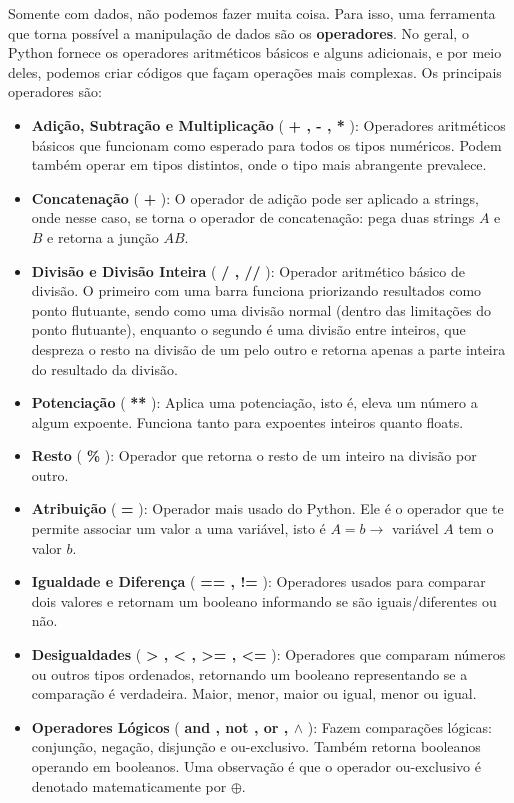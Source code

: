 \documentclass[11pt, a4paper]{article}
\begin{document}
    Somente com dados, não podemos fazer muita coisa. Para isso, uma ferramenta que torna possível a manipulação de dados são os \textbf{operadores}. No geral, o Python fornece os operadores aritméticos básicos e alguns adicionais, e por meio deles, podemos criar códigos que façam operações mais complexas. Os principais operadores são:

\begin{itemize}
    \item \textbf{Adição, Subtração e Multiplicação} (\textbf{ + , - , * }): Operadores aritméticos básicos que funcionam como esperado para todos os tipos numéricos. Podem também operar em tipos distintos, onde o tipo mais abrangente prevalece.

    \item \textbf{Concatenação} (\textbf{ + }): O operador de adição pode ser aplicado a strings, onde nesse caso, se torna o operador de concatenação: pega duas strings \(A\) e \(B\) e retorna a junção \(AB\).

    \item \textbf{Divisão e Divisão Inteira} (\textbf{ / , // }): Operador aritmético básico de divisão. O primeiro com uma barra funciona priorizando resultados como ponto flutuante, sendo como uma divisão normal (dentro das limitações do ponto flutuante), enquanto o segundo é uma divisão entre inteiros, que despreza o resto na divisão de um pelo outro e retorna apenas a parte inteira do resultado da divisão.

    \item \textbf{Potenciação} (     \textbf{**} ): Aplica uma potenciação, isto é, eleva um número a algum expoente. Funciona tanto para expoentes inteiros quanto floats.

    \item \textbf{Resto} ( \textbf{\%} ): Operador que retorna o resto de um inteiro na divisão por outro.

    \item \textbf{Atribuição} ( \textbf{=} ): Operador mais usado do Python. Ele é o operador que te permite associar um valor a uma variável, isto é \(A=b \rightarrow\) variável \(A\) tem o valor \(b\).

    \item \textbf{Igualdade e Diferença} (\textbf{ == , != }): Operadores usados para comparar dois valores e retornam um booleano informando se são iguais/diferentes ou não.

    \item \textbf{Desigualdades} ( \textbf{> , < , >= , <=} ): Operadores que comparam números ou outros tipos ordenados, retornando um booleano representando se a comparação é verdadeira. Maior, menor, maior ou igual, menor ou igual.

    \item \textbf{Operadores Lógicos} ( \textbf{ and , not , or , $\wedge$ } ): Fazem comparações lógicas: conjunção, negação, disjunção e ou-exclusivo. Também retorna booleanos operando em booleanos. Uma observação é que o operador ou-exclusivo é denotado matematicamente por \(\oplus\).
    
\end{itemize}
\end{document}
